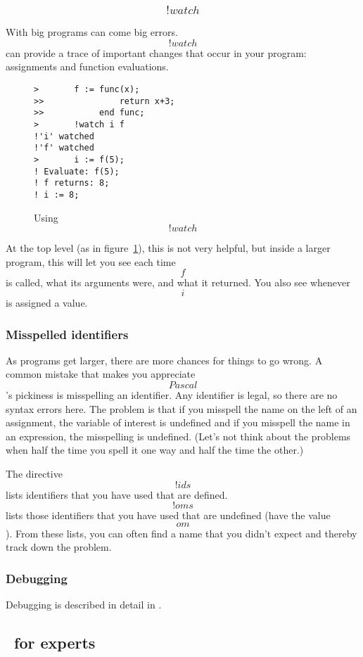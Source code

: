 \subsubsection{\[!watch\]}
With big programs can come big errors.
\[!watch\] can provide a trace of important changes that occur in your
program: assignments and function evaluations.

\begin{figure}[bpt] \begin{verbatim}
>       f := func(x); 
>>               return x+3;
>>           end func;
>       !watch i f
!'i' watched
!'f' watched
>       i := f(5);
! Evaluate: f(5);
! f returns: 8;
! i := 8;
\end{verbatim} 
\caption{Using \[!watch\]\label{ex:watch}}
\end{figure}
At the top level (as in figure~\ref{ex:watch}),
this is not very helpful, but inside a larger
program, this will let you see each time \[f\] is called, what its
arguments were, and what it returned.
You also see whenever \[i\] is assigned a value.

\subsubsection{Misspelled identifiers}
As programs get larger, there are more chances for things to go wrong.
A common mistake that makes you appreciate \[Pascal\]'s pickiness is
misspelling an identifier.  Any identifier is legal, so there are no syntax
errors here.  The problem is that if you misspell the name on the left of
an assignment, the variable of interest is undefined and if you misspell
the name in an expression, the misspelling is undefined.
(Let's not think about the problems when half the time you spell it one way
and half the time the other.)

The directive \[!ids\] lists identifiers that you have used that are
defined.
\[!oms\] lists those identifiers that you have used that are
undefined (have the value \[om\]).  From these lists, you can often find a
name that you didn't expect and thereby track down the problem.


\subsubsection{Debugging}
Debugging is described in detail in \Intro.

\subsection{\ISETL\ for experts}

